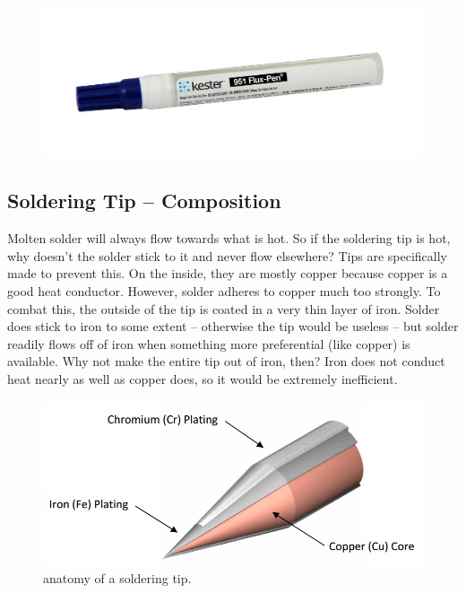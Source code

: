 \begin{figure}[h]
    \includegraphics[scale=0.2]{images/flux_pen.jpg}
\end{figure}

\subsection{Soldering Tip – Composition}
Molten solder will always flow towards what is hot. So if the soldering tip is hot, why doesn't the solder stick to it and never flow elsewhere? Tips are specifically made to prevent this. On the inside, they are mostly copper because copper is a good heat conductor. However, solder adheres to copper much too strongly. To combat this, the outside of the tip is coated in a very thin layer of iron. Solder does stick to iron to some extent – otherwise the tip would be useless – but solder readily flows off of iron when something more preferential (like copper) is available. Why not make the entire tip out of iron, then? Iron does not conduct heat nearly as well as copper does, so it would be extremely inefficient.
\begin{figure}[h]
    \caption{anatomy of a soldering tip.}
    \centering \includegraphics[scale=0.75]{images/tip_anatomy.jpg}
\end{figure}

